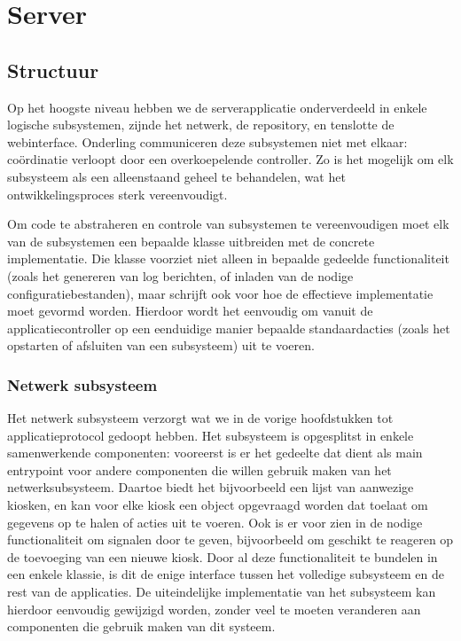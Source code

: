 \part{Server}
\label{server}

\chapter{Structuur}

Op het hoogste niveau hebben we de serverapplicatie onderverdeeld in enkele logische subsystemen, zijnde het netwerk, de repository, en tenslotte de webinterface. Onderling communiceren deze subsystemen niet met elkaar: coördinatie verloopt door een overkoepelende controller. Zo is het mogelijk om elk subsysteem als een alleenstaand geheel te behandelen, wat het ontwikkelingsproces sterk vereenvoudigt.

Om code te abstraheren en controle van subsystemen te vereenvoudigen moet elk van de subsystemen een bepaalde klasse uitbreiden met de concrete implementatie. Die klasse voorziet niet alleen in bepaalde gedeelde functionaliteit (zoals het genereren van log berichten, of inladen van de nodige configuratiebestanden), maar schrijft ook voor hoe de effectieve implementatie moet gevormd worden. Hierdoor wordt het eenvoudig om vanuit de applicatiecontroller op een eenduidige manier bepaalde standaardacties (zoals het opstarten of afsluiten van een subsysteem) uit te voeren.

\section{Netwerk subsysteem}

Het netwerk subsysteem verzorgt wat we in de vorige hoofdstukken tot applicatieprotocol gedoopt hebben. Het subsysteem is opgesplitst in enkele samenwerkende componenten: vooreerst is er het gedeelte dat dient als main entrypoint voor andere componenten die willen gebruik maken van het netwerksubsysteem. Daartoe biedt het bijvoorbeeld een lijst van aanwezige kiosken, en kan voor elke kiosk een object opgevraagd worden dat toelaat om gegevens op te halen of acties uit te voeren. Ook is er voor zien in de nodige functionaliteit om signalen door te geven, bijvoorbeeld om geschikt te reageren op de toevoeging van een nieuwe kiosk.
Door al deze functionaliteit te bundelen in een enkele klassie, is dit de enige interface tussen het volledige subsysteem en de rest van de applicaties. De uiteindelijke implementatie van het subsysteem kan hierdoor eenvoudig gewijzigd worden, zonder veel te moeten veranderen aan componenten die gebruik maken van dit systeem.

